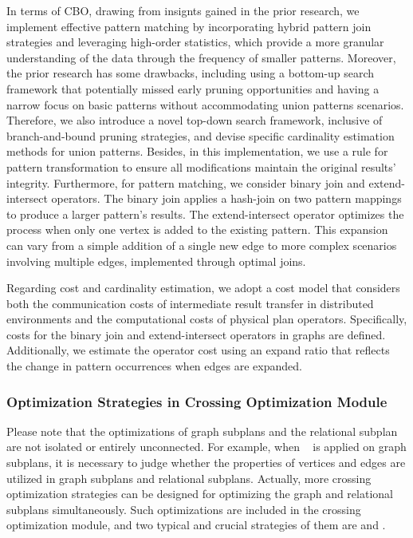 In terms of CBO, drawing from insignts gained in the prior research, we implement effective pattern matching by incorporating hybrid pattern join strategies and leveraging high-order statistics, which provide a more granular understanding of the data through the frequency of smaller patterns.
Moreover, the prior research has some drawbacks, including using a bottom-up search framework that potentially missed early pruning opportunities and having a narrow focus on basic patterns without accommodating union patterns scenarios.
Therefore, we also introduce a novel top-down search framework, inclusive of branch-and-bound pruning strategies, and devise specific cardinality estimation methods for union patterns. 
Besides, in this implementation, we use a rule for pattern transformation to ensure all modifications maintain the original results’ integrity.
Furthermore, for pattern matching, we consider binary join and extend-intersect operators. 
The binary join applies a hash-join on two pattern mappings to produce a larger pattern's results.
The extend-intersect operator optimizes the process when only one vertex is added to the existing pattern. 
This expansion can vary from a simple addition of a single new edge to more complex scenarios involving multiple edges, implemented through optimal joins.

Regarding cost and cardinality estimation, we adopt a cost model that considers both the communication costs of intermediate result transfer in distributed environments and the computational costs of physical plan operators. 
Specifically, costs for the binary join and extend-intersect operators in graphs are defined. 
Additionally, we estimate the operator cost using an expand ratio that reflects the change in pattern occurrences when edges are expanded.

\subsubsection{Optimization Strategies in Crossing Optimization Module}

Please note that the optimizations of graph subplans and the relational subplan are not isolated or entirely unconnected.
For example, when \trimrule~ is applied on graph subplans, it is necessary to judge whether the properties of vertices and edges are utilized in graph subplans and relational subplans.
Actually, more crossing optimization strategies can be designed for optimizing the graph and relational subplans simultaneously.
Such optimizations are included in the crossing optimization module, and two typical and crucial strategies of them are \filterrule and \intersectrule. 

